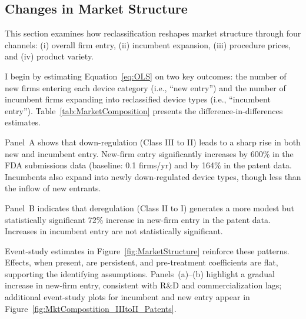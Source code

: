\documentclass[letterpaper,12pt]{article}
\theoremstyle{definition}
\begin{document}
\subsection{Changes in Market Structure}\label{sec:marketcomposition}

This section examines how reclassification reshapes market structure through four channels: (i) overall firm entry, (ii) incumbent expansion, (iii) procedure prices, and (iv) product variety.


I begin by estimating Equation~\ref{eq:OLS} on two key outcomes: the number of new firms entering each device category (i.e., ``new entry'') and the number of incumbent firms expanding into reclassified device types (i.e., ``incumbent entry''). Table~\ref{tab:MarketComposition} presents the difference-in-differences estimates.\footnotemark {}

Panel~A shows that down-regulation (Class III to II) leads to a sharp rise in both new and incumbent entry. New-firm entry significantly increases by 600\% in the FDA submissions data (baseline: 0.1 firms/yr) and by 164\% in the patent data. Incumbents also expand into newly down-regulated device types, though less than the inflow of new entrants.

Panel~B indicates that deregulation (Class II to I) generates a more modest but statistically significant 72\% increase in new-firm entry in the patent data. Increases in incumbent entry are not statistically significant.

Event-study estimates in Figure~\ref{fig:MarketStructure} reinforce these patterns. Effects, when present, are persistent, and pre-treatment coefficients are flat, supporting the identifying assumptions. Panels~(a)--(b) highlight a gradual increase in new-firm entry, consistent with R\&D and commercialization lags; additional event-study plots for incumbent and new entry appear in Figure~\ref{fig:MktCompostition_IIItoII_Patents}.
\end{document}
